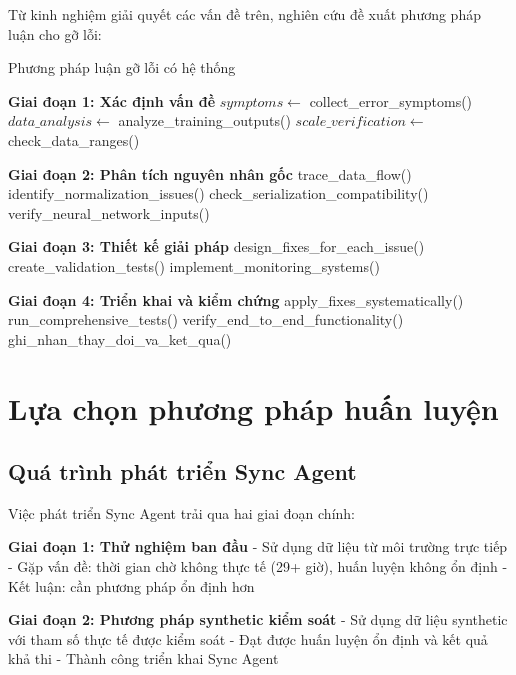 Từ kinh nghiệm giải quyết các vấn đề trên, nghiên cứu đề xuất phương pháp luận cho gỡ lỗi:

\begin{algorithm}[!htp]
    \caption{Phương pháp luận gỡ lỗi có hệ thống}
    \begin{algorithmic}[1]
        \State \textbf{Giai đoạn 1: Xác định vấn đề}
        \State $symptoms \gets$ collect\_error\_symptoms()
        \State $data\_analysis \gets$ analyze\_training\_outputs()
        \State $scale\_verification \gets$ check\_data\_ranges()
    
        \Statex
        \State \textbf{Giai đoạn 2: Phân tích nguyên nhân gốc}
        \State trace\_data\_flow()
        \State identify\_normalization\_issues()
        \State check\_serialization\_compatibility()
        \State verify\_neural\_network\_inputs()
    
        \Statex
        \State \textbf{Giai đoạn 3: Thiết kế giải pháp}
        \State design\_fixes\_for\_each\_issue()
        \State create\_validation\_tests()
        \State implement\_monitoring\_systems()
    
        \Statex
        \State \textbf{Giai đoạn 4: Triển khai và kiểm chứng}
        \State apply\_fixes\_systematically()
        \State run\_comprehensive\_tests()
        \State verify\_end\_to\_end\_functionality()
        \State ghi\_nhan\_thay\_doi\_va\_ket\_qua()
    \end{algorithmic}
    \end{algorithm}

\section{Lựa chọn phương pháp huấn luyện}

\subsection{Quá trình phát triển Sync Agent}

Việc phát triển Sync Agent trải qua hai giai đoạn chính:

\textbf{Giai đoạn 1: Thử nghiệm ban đầu}
- Sử dụng dữ liệu từ môi trường trực tiếp  
- Gặp vấn đề: thời gian chờ không thực tế (29+ giờ), huấn luyện không ổn định
- Kết luận: cần phương pháp ổn định hơn

\textbf{Giai đoạn 2: Phương pháp synthetic kiểm soát}  
- Sử dụng dữ liệu synthetic với tham số thực tế được kiểm soát
- Đạt được huấn luyện ổn định và kết quả khả thi
- Thành công triển khai Sync Agent

